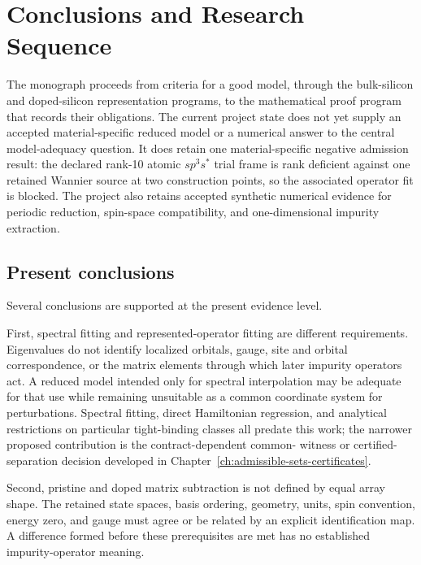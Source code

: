 \chapter{Conclusions and Research Sequence}

\label{ch:conclusions-and-outlook}


The monograph proceeds from criteria for a good model, through the bulk-silicon
and doped-silicon representation programs, to the mathematical proof program
that records their obligations. The current project state does not yet supply
an accepted material-specific reduced model or a numerical answer to the
central model-adequacy question. It
does retain one material-specific negative admission result: the declared
rank-10 atomic $sp^3s^{\ast}$ trial frame is rank deficient against one retained
Wannier source at two construction points, so the associated operator fit is
blocked. The project also retains accepted synthetic numerical evidence for
periodic reduction, spin-space compatibility, and one-dimensional impurity
extraction.

\section{Present conclusions}

Several conclusions are supported at the present evidence level.

First, spectral fitting and represented-operator fitting are different
requirements. Eigenvalues do not identify localized orbitals, gauge, site and
orbital correspondence, or the matrix elements through which later impurity
operators act. A reduced model intended only for spectral interpolation may be
adequate for that use while remaining unsuitable as a common coordinate system
for perturbations. Spectral fitting, direct Hamiltonian regression, and
analytical restrictions on particular tight-binding classes all predate this
work; the narrower proposed contribution is the contract-dependent common-
witness or certified-separation decision developed in
Chapter~\ref{ch:admissible-sets-certificates}.

Second, pristine and doped matrix subtraction is not defined by equal array
shape. The retained state spaces, basis ordering, geometry, units, spin
convention, energy zero, and gauge must agree or be related by an explicit
identification map. A difference formed before these prerequisites are met has
no established impurity-operator meaning.

